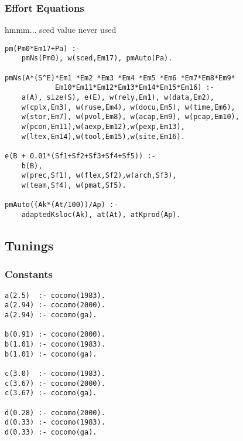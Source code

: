 \subsubsection{ Effort Equations 
}
hmmm... sced value never used
\begin{Verbatim}
pm(Pm0*Em17+Pa) :-
	pmNs(Pm0), w(sced,Em17), pmAuto(Pa).

pmNs(A*(S^E)*Em1 *Em2 *Em3 *Em4 *Em5 *Em6 *Em7*Em8*Em9*
            Em10*Em11*Em12*Em13*Em14*Em15*Em16) :-
	a(A), size(S), e(E), w(rely,Em1), w(data,Em2),
	w(cplx,Em3), w(ruse,Em4), w(docu,Em5), w(time,Em6),
	w(stor,Em7), w(pvol,Em8), w(acap,Em9), w(pcap,Em10),
	w(pcon,Em11),w(aexp,Em12),w(pexp,Em13),
	w(ltex,Em14),w(tool,Em15),w(site,Em16).

e(B + 0.01*(Sf1+Sf2+Sf3+Sf4+Sf5)) :-
	b(B), 
	w(prec,Sf1), w(flex,Sf2),w(arch,Sf3),
	w(team,Sf4), w(pmat,Sf5).

pmAuto((Ak*(At/100))/Ap) :-
	adaptedKsloc(Ak), at(At), atKprod(Ap).
\end{Verbatim}
\subsection{ Tunings 
}
\subsubsection{ Constants
}
\begin{Verbatim}
a(2.5)  :- cocomo(1983).
a(2.94) :- cocomo(2000).
a(2.94) :- cocomo(ga).

b(0.91) :- cocomo(2000).
b(1.01) :- cocomo(1983).
b(1.01) :- cocomo(ga).

c(3.0)  :- cocomo(1983).
c(3.67) :- cocomo(2000).
c(3.67) :- cocomo(ga).

d(0.28) :- cocomo(2000).
d(0.33) :- cocomo(1983).
d(0.33) :- cocomo(ga).
\end{Verbatim}
